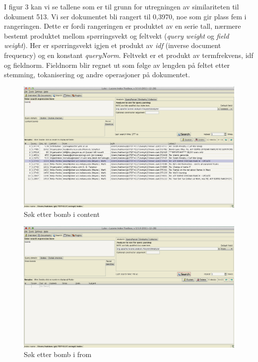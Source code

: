 I figur 3 kan vi se tallene som er til grunn for utregningen av similariteten til dokument 513. Vi ser dokumentet bli rangert til 0,3970, noe som gir plass fem i rangeringen. Dette er fordi rangeringen er produktet av en serie tall, nærmere bestemt produktet mellom spørringsvekt og feltvekt (\textit{query weight} og \textit{field weight}). Her er spørringsvekt igjen et produkt av \textit{idf} (inverse document frequency) og en konstant \textit{queryNorm}. Feltvekt er et produkt av termfrekvens, idf og fieldnorm. Fieldnorm blir regnet ut som følge av lengden på feltet etter stemming, tokanisering og andre operasjoner på dokumentet.  \\\hfill


\begin{figure}[p]
\centering
\includegraphics[scale=0.31]{images/bombcontent.png}
\caption{Søk etter bomb i content}
\end{figure}

\begin{figure}[p]
\centering
\includegraphics[scale=0.31]{images/bombfrom.png}
\caption{Søk etter bomb i from}
\end{figure}

